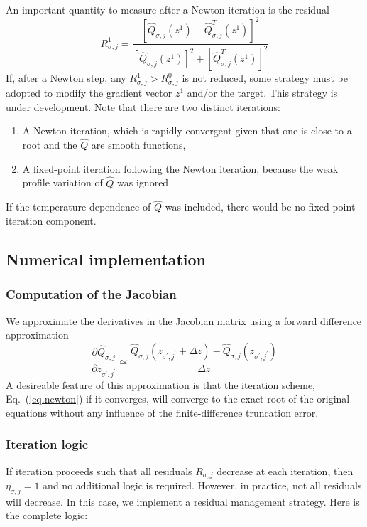 \documentclass[dvips,12pt]{revtex4}
\newcommand\qhat{\widehat{Q}}
\newcommand{\sj}{{\sigma,j}}
\newcommand{\spjp}{{\sigma^\prime,j^\prime}}
\begin{document}
%
An important quantity to measure after a Newton iteration is
the residual 
\begin{equation}
R^1_\sj = \frac{\left[\qhat_\sj(z^1)-\qhat^T_\sj(z^1)\right]^2}{
 \left[\qhat_\sj(z^1)\right]^2+\left[\qhat^T_\sj(z^1)\right]^2}
\end{equation}
%
If, after a Newton step, any $R^1_\sj > R^0_\sj$ is not 
reduced, some strategy must be adopted to modify the 
gradient vector $z^1$ and/or the target.  This strategy 
is under development.  Note that there are two distinct 
iterations: 
%
\begin{enumerate}
\item
A Newton iteration, which is rapidly convergent given 
that one is close to a root and the $\qhat$ are smooth 
functions, 
\item
A fixed-point iteration following the Newton iteration,
because the weak profile variation of $\qhat$ was 
ignored
\end{enumerate}
If the temperature dependence of $\qhat$ was included, there 
would be no fixed-point iteration component.

\subsection{Numerical implementation}

\subsubsection{Computation of the Jacobian}

We approximate the derivatives in the Jacobian 
matrix using a forward difference approximation
%
\begin{equation}
\frac{\partial \qhat_\sj}{\partial z_\spjp} \simeq 
\frac{\qhat_\sj (z_\spjp + \Delta z) -\qhat_\sj (z_\spjp)}{\Delta z} 
\end{equation}
%
A desireable feature of this approximation is that the 
iteration scheme, Eq.~(\ref{eq.newton}) if it converges, 
will converge to the exact root of the original equations 
without any influence of the finite-difference truncation 
error.

\subsubsection{Iteration logic}

If iteration proceeds such that all residuals $R_\sj$ 
decrease at each iteration, then $\eta_\sj = 1$ and no 
additional logic is required.  However, in practice, 
not all residuals will decrease.  In this case, we 
implement a residual management strategy.  Here is the
complete logic:
\end{document}
